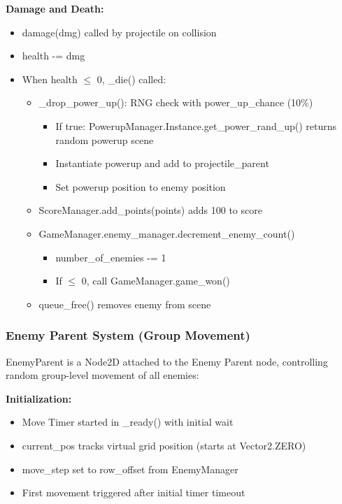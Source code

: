 \documentclass{article}
\begin{document}
\textbf{Damage and Death:}
\begin{itemize}
    \item damage(dmg) called by projectile on collision
    \item health -= dmg
    \item When health $\leq$ 0, \_die() called:
    \begin{itemize}
        \item \_drop\_power\_up(): RNG check with power\_up\_chance (10\%)
        \begin{itemize}
            \item If true: PowerupManager.Instance.get\_power\_rand\_up() returns random powerup scene
            \item Instantiate powerup and add to projectile\_parent
            \item Set powerup position to enemy position
        \end{itemize}
        \item ScoreManager.add\_points(points) adds 100 to score
        \item GameManager.enemy\_manager.decrement\_enemy\_count()
        \begin{itemize}
            \item number\_of\_enemies -= 1
            \item If $\leq$ 0, call GameManager.game\_won()
        \end{itemize}
        \item queue\_free() removes enemy from scene
    \end{itemize}
\end{itemize}

\subsubsection{Enemy Parent System (Group Movement)}

EnemyParent is a Node2D attached to the Enemy Parent node, controlling random group-level movement of all enemies:

\textbf{Initialization:}
\begin{itemize}
    \item Move Timer started in \_ready() with initial wait
    \item current\_pos tracks virtual grid position (starts at Vector2.ZERO)
    \item move\_step set to row\_offset from EnemyManager
    \item First movement triggered after initial timer timeout
\end{itemize}
\end{document}
